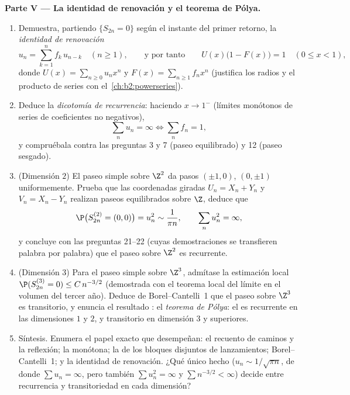 \begin{problem}
\medskip
\noindent\textbf{Parte V --- La identidad de renovación y el teorema
de Pólya.}
\begin{enumerate}[resume]
  \item Demuestra, partiendo $\{S_{2n} = 0\}$ según el instante del
        primer retorno, la \emph{identidad de renovación}
        \[
        u_n = \sum_{k=1}^n f_k\,u_{n-k} \quad (n \geq 1),
        \qquad\text{y por tanto}\qquad
        U(x)\bigl(1 - F(x)\bigr) = 1 \quad (0 \leq x < 1),
        \]
        donde $U(x) = \sum_{n\geq0}u_nx^n$ y $F(x) =
        \sum_{n\geq1}f_nx^n$ (justifica los radios y el producto de
        series con el~\cref{ch:b2:powerseries}).
  \item Deduce la \emph{dicotomía de recurrencia}: haciendo $x \to
        1^-$ (límites monótonos de series de coeficientes no
        negativos),
        \[
        \sum_n u_n = \infty \iff \sum_n f_n = 1 ,
        \]
        y compruébala contra las preguntas 3 y 7 (paseo equilibrado)
        y 12 (paseo sesgado).
  \item (Dimensión $2$) El paseo simple sobre $\Z^2$ da pasos
        $(\pm1, 0)$, $(0, \pm1)$ uniformemente. Prueba que las
        coordenadas giradas $U_n = X_n + Y_n$ y $V_n = X_n - Y_n$
        realizan paseos equilibrados \emph{} sobre $\Z$,
        deduce que
        \[
        \P\bigl(S^{(2)}_{2n} = (0,0)\bigr) = u_n^2 \sim
        \frac1{\pi n},
        \qquad \sum_n u_n^2 = \infty ,
        \]
        y concluye con las preguntas 21--22 (cuyas demostraciones se
        transfieren palabra por palabra) que el paseo sobre $\Z^2$
        es recurrente.
  \item (Dimensión $3$) Para el paseo simple sobre $\Z^3$, admítase
        la estimación local $\P(S^{(3)}_{2n} = 0) \leq C\,n^{-3/2}$
        (demostrada con el teorema local del límite en el volumen
        del tercer año). Deduce de Borel--Cantelli~1 que el paseo
        sobre $\Z^3$ es transitorio, y enuncia el resultado
        : el \emph{teorema de Pólya}: el
         es recurrente en las dimensiones $1$ y
        $2$, y transitorio en dimensión $3$ y superiores.
  \item Síntesis. Enumera el papel exacto que desempeñan: el recuento
        de caminos y la reflexión; la  monótona; la
         de los bloques disjuntos de lanzamientos;
        Borel--Cantelli~1; y la identidad de renovación. ¿Qué único
        hecho  ($u_n \sim 1/\sqrt{\pi n}$, de donde $\sum
        u_n = \infty$, pero también $\sum u_n^2 = \infty$ y $\sum
        n^{-3/2} < \infty$) decide entre recurrencia y transitoriedad
        en cada dimensión?
\end{enumerate}
\end{problem}

